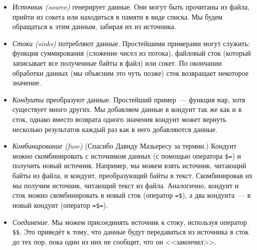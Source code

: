 \begin{itemize}
 \item \emph{Источник (source)} генерирует данные. Они могут быть прочитаны из файла, прийти из
сокета или находиться в памяти в виде списка. Мы будем обращаться к этим данным, забирая их из
источника.

 \item \emph{Стоки (sinks)} потребляют данные.
 Простейшими примерами могут служить: функция суммирования (сложение чисел из потока), файловый сток (который записывает все полученные байты в файл) или сокет.
По окончании обработки данных (мы объясним это чуть позже) сток возвращает некоторое значение.

 \item \emph{Кондуиты} преобразуют данные. Простейший пример~--- функция
\lstinline=map=,
хотя существует много других. Мы добавляем данные в кондуит так же как и в сток, однако вместо
возврата одного значения кондуит может вернуть несколько результатов каждый раз
как в него добавляются данные.

  \item \emph{Комбинирование (fuse)} (Спасибо Давиду Мазьересу за термин.) Кондуит можно
скомбинировать с источником данных (с помощью оператора \lstinline!$=!) и получить
новый источник. Например, мы можем взять источник, читающий байты из файла, и
кондуит, преобразующий байты в текст. Скомбинировав их мы получим
источник, читающий текст из файла. Аналогично, кондуит и сток можно скомбинировать в новый сток
(оператор \lstinline!=$!), а два кондуита~--- в новый кондуит (оператор \lstinline!=$=!).

  \item \emph{Соединение}. Мы можем присоединять источник к стоку, используя оператор \lstinline!$$!.
Это приведёт к тому, что данные будут передаваться из источника в сток до тех пор, пока
один из них не сообщит, что он <<закончил>>.
\end{itemize}

